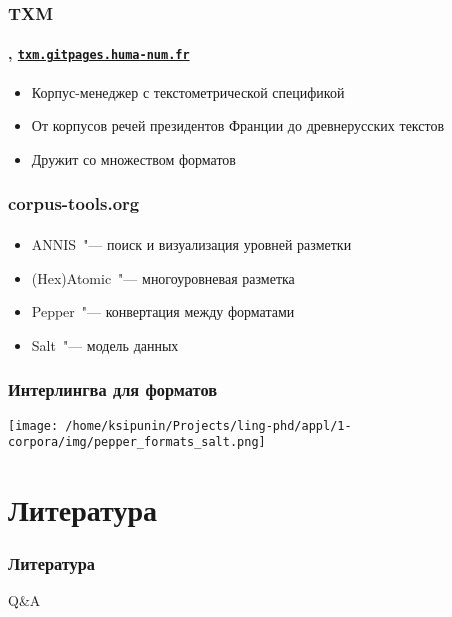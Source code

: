 
\begin{frame}
    \frametitle{TXM}
    \framesubtitle{\autocite{heiden:2010}, \href{https://txm.gitpages.huma-num.fr/textometrie/en/index.html}{\texttt{txm.gitpages.huma-num.fr}}}

    \begin{itemize}
        \item Корпус-менеджер с текстометрической спецификой
        \item От корпусов речей президентов Франции до древнерусских текстов
        \item Дружит со множеством форматов
    \end{itemize}
\end{frame}

\begin{frame}
    \frametitle{corpus-tools.org}
    \framesubtitle{\autocite{corpus_tools}}

    \begin{itemize}
        \item ANNIS~"--- поиск и визуализация уровней разметки
        \item (Hex)Atomic~"--- многоуровневая разметка
        \item Pepper~"--- конвертация между форматами
        \item Salt~"--- модель данных
    \end{itemize}
\end{frame}

\begin{frame}
    \frametitle{Интерлингва для форматов}
    \centering
    \texttt{[image: /home/ksipunin/Projects/ling-phd/appl/1-corpora/img/pepper\_formats\_salt.png]}
\end{frame}

\section{Литература}

\frame{\tableofcontents[currentsection]}

\begin{frame}[allowframebreaks]
    \frametitle{Литература}
    \nocite{*}
    \printbibliography
\end{frame}

\begin{frame}{}
    \centering

    \vfill
    Q\&A
    \vfill
\end{frame}


